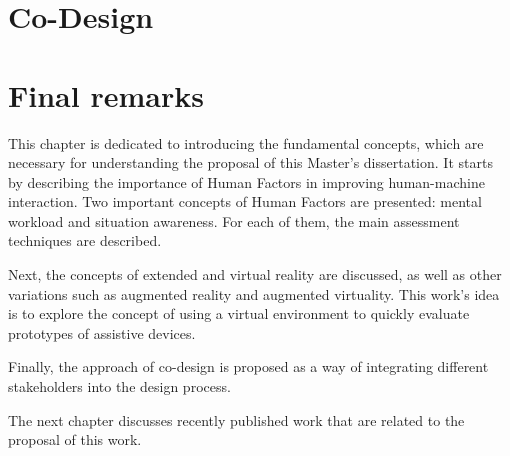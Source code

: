         

\section{Co-Design}
\label{sec:co_design}

    

\section{Final remarks}
\label{sec:final_remarks2}


This chapter is dedicated to introducing the fundamental concepts, which are necessary for understanding the proposal of this Master's dissertation. It starts by describing the importance of Human Factors in improving human-machine interaction. Two important concepts of Human Factors are presented: mental workload and situation awareness. For each of them, the main assessment techniques are described.

Next, the concepts of extended and virtual reality are discussed, as well as other variations such as augmented reality and augmented virtuality. This work's idea is to explore the concept of using a virtual environment to quickly evaluate prototypes of assistive devices.

Finally, the approach of co-design is proposed as a way of integrating different stakeholders into the design process. 

The next chapter discusses recently published work that are related to the proposal of this work.
